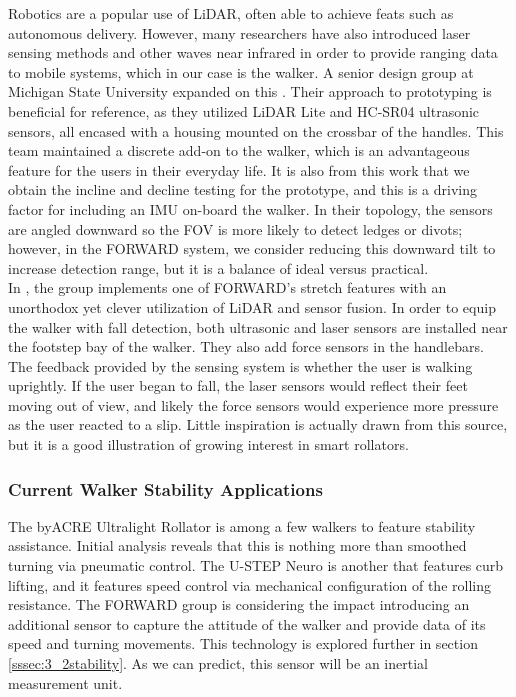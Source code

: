 \noindent Robotics are a popular use of LiDAR, often able to achieve feats such as autonomous delivery. However, many researchers have also introduced laser sensing methods and other waves near infrared in order to provide ranging data to mobile systems, which in our case is the walker. A senior design group at Michigan State University expanded on this \cite{mstate}. Their approach to prototyping is beneficial for reference, as they utilized LiDAR Lite and HC-SR04 ultrasonic sensors, all encased with a housing mounted on the crossbar of the handles. This team maintained a discrete add-on to the walker, which is an advantageous feature for the users in their everyday life. It is also from this work that we obtain the incline and decline testing for the prototype, and this is a driving factor for including an IMU on-board the walker. In their topology, the sensors are angled downward so the FOV is more likely to detect ledges or divots; however, in the FORWARD system, we consider reducing this downward tilt to increase detection range, but it is a balance of ideal versus practical.\\

\noindent In \cite{FallDetect}, the group implements one of FORWARD's stretch features with an unorthodox yet clever utilization of LiDAR and sensor fusion. In order to equip the walker with fall detection, both ultrasonic and laser sensors are installed near the footstep bay of the walker. They also add force sensors in the handlebars. The feedback provided by the sensing system is whether the user is walking uprightly. If the user began to fall, the laser sensors would reflect their feet moving out of view, and likely the force sensors would experience more pressure as the user reacted to a slip. Little inspiration is actually drawn from this source, but it is a good illustration of growing interest in smart rollators.

\subsubsection{Current Walker Stability Applications}
\noindent The byACRE Ultralight Rollator \cite{byACRE} is among a few walkers to feature stability assistance. Initial analysis reveals that this is nothing more than smoothed turning via pneumatic control. The U-STEP Neuro \cite{ustep} is another that features curb lifting, and it features speed control via mechanical configuration of the rolling resistance. The FORWARD group is considering the impact introducing an additional sensor to capture the attitude of the walker and provide data of its speed and turning movements. This technology is explored further in section \ref{sssec:3_2stability}. As we can predict, this sensor will be an inertial measurement unit.

